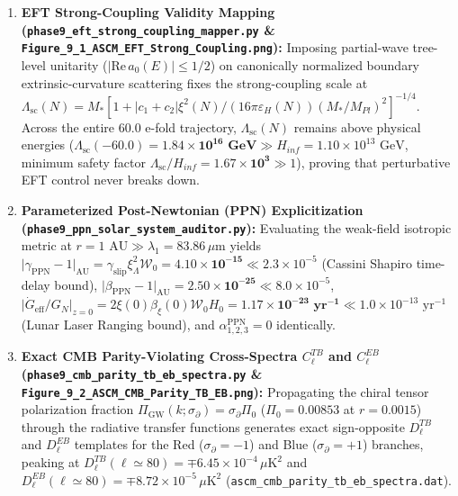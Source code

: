 \documentclass[aps,prd,onecolumn,superscriptaddress,nofootinbib,longbibliography,10pt]{revtex4-2}
\begin{document}
{{\begin{enumerate}
  
\item \textbf{EFT Strong-Coupling Validity Mapping (\texttt{phase9_eft_strong_coupling_mapper.py} \& \texttt{Figure_9_1_ASCM_EFT_Strong_Coupling.png}):} Imposing partial-wave tree-level unitarity (\(|\mathrm{Re}\,a_0(E)| \le 1/2\)) on canonically normalized boundary extrinsic-curvature scattering fixes the strong-coupling scale at \(\Lambda_{\mathrm{sc}}(N) = M_*[1 + |c_1+c_2|\xi^2(N)/(16\pi\varepsilon_H(N))(M_*/M_{Pl})^2]^{-1/4}\). Across the entire \(60.0\) e-fold trajectory, \(\Lambda_{\mathrm{sc}}(N)\) remains above physical energies (\(\Lambda_{\mathrm{sc}}(-60.0) = \mathbf{1.84 \times 10^{16}\text{ GeV}} \gg H_{inf} = 1.10 \times 10^{13}\text{ GeV}\), minimum safety factor \(\Lambda_{\mathrm{sc}}/H_{inf} = \mathbf{1.67 \times 10^3} \gg 1\)), proving that perturbative EFT control never breaks down.
  
\item \textbf{Parameterized Post-Newtonian (PPN) Explicitization (\texttt{phase9_ppn_solar_system_auditor.py}):} Evaluating the weak-field isotropic metric at \(r = 1\text{ AU} \gg \lambda_1 = 83.86\,\mu\text{m}\) yields \(\big|\gamma_{\mathrm{PPN}} - 1\big|_{\mathrm{AU}} = \gamma_{\mathrm{slip}}\xi_\Lambda^2\mathcal{W}_0 = \mathbf{4.10 \times 10^{-15}} \ll 2.3 \times 10^{-5}\) (Cassini Shapiro time-delay bound), \(\big|\beta_{\mathrm{PPN}} - 1\big|_{\mathrm{AU}} = \mathbf{2.50 \times 10^{-25}} \ll 8.0 \times 10^{-5}\), \(\big|\dot{G}_{\mathrm{eff}}/G_N\big|_{z=0} = 2\xi(0)\beta_\xi(0)\mathcal{W}_0 H_0 = \mathbf{1.17 \times 10^{-23}\text{ yr}^{-1}} \ll 1.0 \times 10^{-13}\text{ yr}^{-1}\) (Lunar Laser Ranging bound), and \(\alpha_{1,2,3}^{\mathrm{PPN}} = 0\) identically.
  
\item \textbf{Exact CMB Parity-Violating Cross-Spectra \(C_\ell^{TB}\) and \(C_\ell^{EB}\) (\texttt{phase9_cmb_parity_tb_eb_spectra.py} \& \texttt{Figure_9_2_ASCM_CMB_Parity_TB_EB.png}):} Propagating the chiral tensor polarization fraction \(\Pi_{\mathrm{GW}}(k;\sigma_{\partial}) = \sigma_{\partial}\Pi_0\) (\(\Pi_0 = 0.00853\) at \(r = 0.0015\)) through the radiative transfer functions generates exact sign-opposite \(D_\ell^{TB}\) and \(D_\ell^{EB}\) templates for the Red (\(\sigma_{\partial} = -1\)) and Blue (\(\sigma_{\partial} = +1\)) branches, peaking at \(D_\ell^{TB}(\ell \simeq 80) = \mp 6.45 \times 10^{-4}\,\mu\mathrm{K}^2\) and \(D_\ell^{EB}(\ell \simeq 80) = \mp 8.72 \times 10^{-5}\,\mu\mathrm{K}^2\) (\texttt{ascm_cmb_parity_tb_eb_spectra.dat}).
  

\end{enumerate}}}
\end{document}
